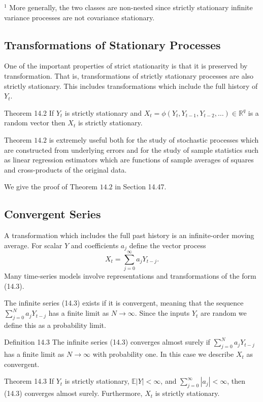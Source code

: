 \documentclass[10pt]{article}
\begin{document}
${ }^{1}$ More generally, the two classes are non-nested since strictly stationary infinite variance processes are not covariance stationary.

\subsection{Transformations of Stationary Processes}
One of the important properties of strict stationarity is that it is preserved by transformation. That is, transformations of strictly stationary processes are also strictly stationary. This includes transformations which include the full history of $Y_{t}$.

Theorem 14.2 If $Y_{t}$ is strictly stationary and $X_{t}=\phi\left(Y_{t}, Y_{t-1}, Y_{t-2}, \ldots\right) \in \mathbb{R}^{q}$ is a random vector then $X_{t}$ is strictly stationary.

Theorem $14.2$ is extremely useful both for the study of stochastic processes which are constructed from underlying errors and for the study of sample statistics such as linear regression estimators which are functions of sample averages of squares and cross-products of the original data.

We give the proof of Theorem $14.2$ in Section 14.47.

\subsection{Convergent Series}
A transformation which includes the full past history is an infinite-order moving average. For scalar $Y$ and coefficients $a_{j}$ define the vector process
$$
X_{t}=\sum_{j=0}^{\infty} a_{j} Y_{t-j} .
$$
Many time-series models involve representations and transformations of the form (14.3).

The infinite series (14.3) exists if it is convergent, meaning that the sequence $\sum_{j=0}^{N} a_{j} Y_{t-j}$ has a finite limit as $N \rightarrow \infty$. Since the inputs $Y_{t}$ are random we define this as a probability limit.

Definition 14.3 The infinite series (14.3) converges almost surely if $\sum_{j=0}^{N} a_{j} Y_{t-j}$ has a finite limit as $N \rightarrow \infty$ with probability one. In this case we describe $X_{t}$ as convergent.

Theorem 14.3 If $Y_{t}$ is strictly stationary, $\mathbb{E}|Y|<\infty$, and $\sum_{j=0}^{\infty}\left|a_{j}\right|<\infty$, then (14.3) converges almost surely. Furthermore, $X_{t}$ is strictly stationary.
\end{document}
